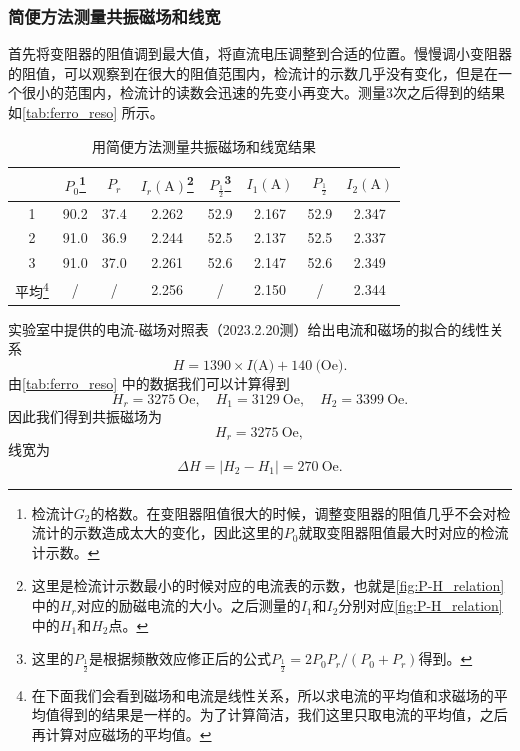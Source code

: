 \documentclass[font=default]{mpltx}
\begin{document}
\subsubsection{简便方法测量共振磁场和线宽}
首先将变阻器的阻值调到最大值，将直流电压调整到合适的位置。慢慢调小变阻器的阻值，可以观察到在很大的阻值范围内，检流计的示数几乎没有变化，但是在一个很小的范围内，检流计的读数会迅速的先变小再变大。测量3次之后得到的结果如\autoref{tab:ferro_reso} 所示。
\begin{table}[h]
  \caption{用简便方法测量共振磁场和线宽结果}
  \vspace{0.2cm}
  \label{tab:ferro_reso}
  \begin{tabular}{c|c|cc|cc|cc}
    \hline
     & $P_0$\footnote{检流计$G_2$的格数。在变阻器阻值很大的时候，调整变阻器的阻值几乎不会对检流计的示数造成太大的变化，因此这里的$P_0$就取变阻器阻值最大时对应的检流计示数。} & $P_r$ & $I_r(\text{A})$\footnote{这里是检流计示数最小的时候对应的电流表的示数，也就是\autoref{fig:P-H_relation} 中的$H_r$对应的励磁电流的大小。之后测量的$I_1$和$I_2$分别对应\autoref{fig:P-H_relation} 中的$H_1$和$H_2$点。}  & $P_{\frac12}$\footnote{这里的$P_{\frac12}$是根据频散效应修正后的公式$P_{\frac12}=2P_0P_r/(P_0+P_r)$得到。} & $I_1(\text{A})$  & $P_{\frac12}$ & $I_2(\text{A})$  \\\hline\hline
  1  & 90.2 & 37.4 & 2.262 & 52.9  & 2.167 & 52.9  & 2.347 \\\hline
  2  & 91.0 & 36.9 & 2.244 & 52.5  & 2.137 & 52.5  & 2.337 \\\hline
  3  & 91.0 & 37.0 & 2.261 & 52.6  & 2.147 & 52.6  & 2.349 \\\hline
  平均\footnote{在下面我们会看到磁场和电流是线性关系，所以求电流的平均值和求磁场的平均值得到的结果是一样的。为了计算简洁，我们这里只取电流的平均值，之后再计算对应磁场的平均值。} & /    & /    & 2.256 & / & 2.150  & /  &  2.344  \\\hline
  \end{tabular}
\end{table}

实验室中提供的电流-磁场对照表（2023.2.20测）给出电流和磁场的拟合的线性关系$$H=1390\times I\text{(A)}+140\ \text{(Oe)}.$$由\autoref{tab:ferro_reso} 中的数据我们可以计算得到
$$H_r=3275\ {\text{Oe}},\quad H_1=3129\ {\text{Oe}},\quad H_2=3399\ {\text{Oe}}.$$
因此我们得到共振磁场为$$H_r=3275\ {\text{Oe}},$$线宽为$$\Delta H=|H_2-H_1|=270\ {\text{Oe}}.$$
\end{document}
